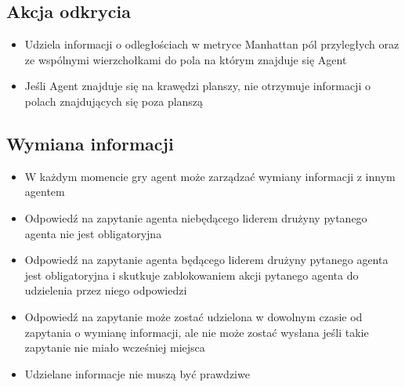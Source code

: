\documentclass[Dokumentacja.tex]{subfiles}
\begin{document}
\subsection{Akcja odkrycia}
\begin{itemize}
    \item Udziela informacji o odległościach w metryce Manhattan pól przyległych oraz ze wspólnymi wierzchołkami do pola na którym znajduje się Agent
    \item Jeśli Agent znajduje się na krawędzi planszy, nie otrzymuje informacji o polach znajdujących się poza planszą
\end{itemize}
\subsection{Wymiana informacji}
\begin{itemize}
    \item W każdym momencie gry agent może zarządzać wymiany informacji z innym agentem
    \item Odpowiedź na zapytanie agenta niebędącego liderem drużyny pytanego agenta nie jest obligatoryjna
    \item Odpowiedź na zapytanie agenta będącego liderem drużyny pytanego agenta jest obligatoryjna i skutkuje zablokowaniem akcji pytanego agenta do udzielenia przez niego odpowiedzi
    \item Odpowiedź na zapytanie może zostać udzielona w dowolnym czasie od zapytania o wymianę informacji, ale nie może zostać wysłana jeśli takie zapytanie nie miało wcześniej miejsca
    \item Udzielane informacje nie muszą być prawdziwe
\end{itemize}
\end{document}
